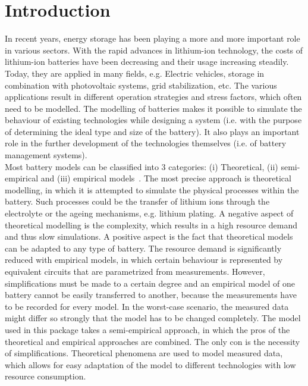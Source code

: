 \section{Introduction}
In recent years, energy storage has been playing a more and more important role in various sectors. With the rapid advances in lithium-ion technology, the costs of lithium-ion batteries have been decreasing and their usage increasing steadily. Today, they are applied in many fields, e.g. Electric vehicles, storage in combination with photovoltaic systems, grid stabilization, etc. The various applications result in different operation strategies and stress factors, which often need to be modelled. The modelling of batteries makes it possible to simulate the behaviour of existing technologies while designing a system (i.e. with the purpose of determining the ideal type and size of the battery). It also plays an important role in the further development of the technologies themselves (i.e. of battery management systems). \\
Most battery models can be classified into 3 categories: (i) Theoretical, (ii) semi-empirical and (iii) empirical models~\cite{cui_multi-stress_2015, xu_degradation-limiting_2013}. The most precise approach is theoretical modelling, in which it is attempted to simulate the physical processes within the battery. Such processes could be the transfer of lithium ions through the electrolyte or the ageing mechanisms, e.g. lithium plating. A negative aspect of theoretical modelling is the complexity, which results in a high resource demand and thus slow simulations. A positive aspect is the fact that theoretical models can be adapted to any type of battery. The resource demand is significantly reduced with empirical models, in which certain behaviour is represented by equivalent circuits that are parametrized from measurements. However, simplifications must be made to a certain degree and an empirical model of one battery cannot be easily transferred to another, because the measurements have to be recorded for every model. In the worst-case scenario, the measured data might differ so strongly that the model has to be changed completely. The model used in this package takes a semi-empirical approach, in which the pros of the theoretical and empirical approaches are combined. The only con is the necessity of simplifications. Theoretical phenomena are used to model measured data, which allows for easy adaptation of the model to different technologies with low resource consumption. \\
